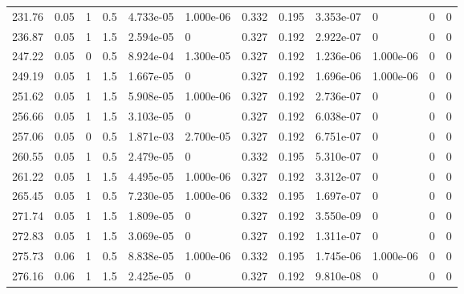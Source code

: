 \documentclass[preview]{standalone}
\begin{document}
{{\begin{tabular}{L{1.2cm}C{1.2cm} C{0.3cm}C{0.5cm} C{1.4cm}C{1.4cm} C{1.4cm}C{1.4cm} C{1.6cm}C{1.6cm} C{1.6cm}C{1.6cm}}
  231.76  &  0.05  & 1     & 0.5 &  4.733e-05  & 1.000e-06  &  0.332&   0.195& 3.353e-07 & 0   &  0 & 0  \\ 
  236.87  &  0.05  & 1     & 1.5 &  2.594e-05  & 0  &  0.327&   0.192& 2.922e-07 & 0   &  0 & 0  \\ 
  247.22  &  0.05  & 0     & 0.5 &  8.924e-04  & 1.300e-05  &  0.327&   0.192& 1.236e-06 & 1.000e-06   &  0 & 0  \\ 
  249.19  &  0.05  & 1     & 1.5 &  1.667e-05  & 0  &  0.327&   0.192& 1.696e-06 & 1.000e-06   &  0 & 0  \\ 
  251.62  &  0.05  & 1     & 1.5 &  5.908e-05  & 1.000e-06  &  0.327&   0.192& 2.736e-07 & 0   &  0 & 0  \\ 
  256.66  &  0.05  & 1     & 1.5 &  3.103e-05  & 0  &  0.327&   0.192& 6.038e-07 & 0   &  0 & 0  \\ 
  257.06  &  0.05  & 0     & 0.5 &  1.871e-03  & 2.700e-05  &  0.327&   0.192& 6.751e-07 & 0   &  0 & 0  \\ 
  260.55  &  0.05  & 1     & 0.5 &  2.479e-05  & 0  &  0.332&   0.195& 5.310e-07 & 0   &  0 & 0  \\ 
  261.22  &  0.05  & 1     & 1.5 &  4.495e-05  & 1.000e-06  &  0.327&   0.192& 3.312e-07 & 0   &  0 & 0  \\ 
  265.45  &  0.05  & 1     & 0.5 &  7.230e-05  & 1.000e-06  &  0.332&   0.195& 1.697e-07 & 0   &  0 & 0  \\ 
  271.74  &  0.05  & 1     & 1.5 &  1.809e-05  & 0  &  0.327&   0.192& 3.550e-09 & 0   &  0 & 0  \\ 
  272.83  &  0.05  & 1     & 1.5 &  3.069e-05  & 0  &  0.327&   0.192& 1.311e-07 & 0   &  0 & 0  \\ 
  275.73  &  0.06  & 1     & 0.5 &  8.838e-05  & 1.000e-06  &  0.332&   0.195& 1.745e-06 & 1.000e-06   &  0 & 0  \\ 
  276.16  &  0.06  & 1     & 1.5 &  2.425e-05  & 0  &  0.327&   0.192& 9.810e-08 & 0   &  0 & 0  \\ 
\hline 
\end{tabular} 

}}
\end{document}
